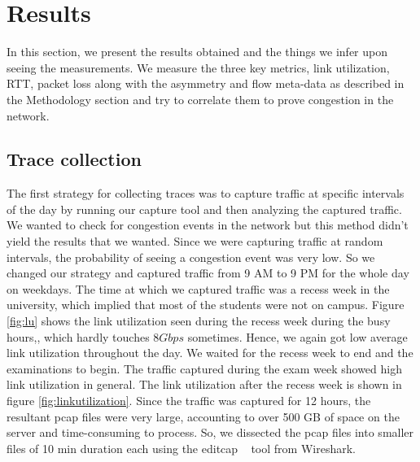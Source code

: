
\chapter{Results} %

\label{Chapter4} %


In this section, we present the results obtained and the things we infer upon seeing the measurements. We measure the three key metrics, link utilization, RTT, packet loss along with the asymmetry and flow meta-data as described in the Methodology section and try to correlate them to prove congestion in the network.

\section{Trace collection}
The first strategy for collecting traces was to capture traffic at specific intervals of the day by running our capture tool and then analyzing the captured traffic. We wanted to check for congestion events in the network but this method didn't yield the results that we wanted. Since we were capturing traffic at random intervals, the probability of seeing a congestion event was very low. So we changed our strategy and captured traffic from 9 AM to 9 PM for the whole day on weekdays. The time at which we captured traffic was a recess week in the university, which implied that most of the students were not on campus. Figure \ref{fig:lu} shows the link utilization seen during the recess week during the busy hours,, which hardly touches $8Gbps$ sometimes. Hence, we again got low average link utilization throughout the day. We waited for the recess week to end and the examinations to begin. The traffic captured during the exam week showed high link utilization in general. The link utilization after the recess week is shown in figure \ref{fig:linkutilization}. Since the traffic was captured for 12 hours, the resultant pcap files were very large, accounting to over 500 GB of space on the server and time-consuming to process. So, we dissected the pcap files into smaller files of 10 min duration each using the editcap ~\cite{wireshark} tool from Wireshark.

